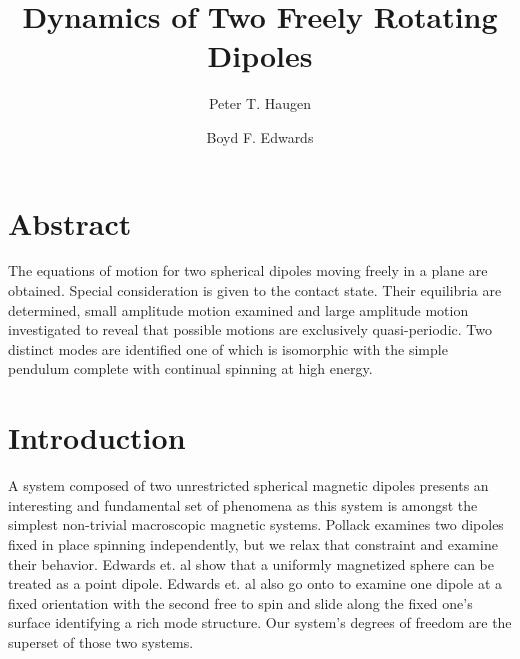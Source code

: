 \documentclass[prbg,preprint]{revtex4-1}
\begin{document}
\title{Dynamics of Two Freely Rotating Dipoles}
\author{Peter T. Haugen}
\author{Boyd F. Edwards}
\maketitle
\section{Abstract}
	The equations of motion for two spherical dipoles moving freely in a plane are obtained. Special consideration is given to the contact state. Their equilibria are determined, small amplitude motion examined and large amplitude motion investigated to reveal that possible motions are exclusively quasi-periodic.
	Two distinct modes are identified one of which is isomorphic with the simple pendulum complete with continual spinning at high energy.
	
\section{Introduction}
A system composed of two unrestricted spherical magnetic dipoles presents an interesting and fundamental set of phenomena as this system is amongst the simplest non-trivial macroscopic magnetic systems. Pollack \cite{doi:10.1139/p96-151} examines two dipoles fixed in place spinning independently, but we relax that constraint and examine their behavior. Edwards et. al \cite{Edwards:2017aa} show that a uniformly magnetized sphere can be treated as a point dipole. Edwards et. al  \cite{Edwards:2017ab} also go onto to examine one dipole at a fixed orientation with the second free to spin and slide along the fixed one's surface identifying a rich mode structure. Our system's degrees of freedom are the superset of those two systems.
\end{document}

